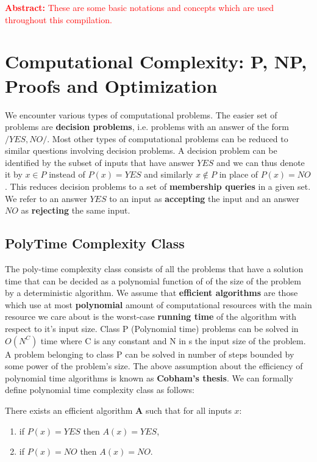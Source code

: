 \textcolor{red}{\textbf{Abstract:} These are some basic notations and concepts which are used throughout this compilation.}

\section{Computational Complexity: P, NP, Proofs and Optimization}
We encounter various types of computational problems. The easier set of problems are \textbf{decision problems}, i.e. problems with an answer of the form $/{YES, NO/}$. Most other types of computational problems can be reduced to similar questions involving decision problems. A decision problem can be identified by the subset of inputs that have answer $YES$ and we can thus denote it by $x \in P$ instead of $P(x) = YES$ and similarly $x \notin P$ in place of $P(x) = NO$. This reduces decision problems to a set of \textbf{membership queries} in a given set. We refer to an answer $YES$ to an input as \textbf{accepting} the input and an answer $NO$ as \textbf{rejecting} the same input.

 \subsection{PolyTime Complexity Class}
 The poly-time complexity class consists of all the problems that have  a solution time that can be decided as  a polynomial function of of the size of the problem by a deterministic algorithm. We assume that \textbf{efficient algorithms} are those which use at most \textbf{polynomial} amount of computational resources with the main resource we care about is the worst-case \textbf{running time} of the algorithm with respect to it's input size. Class P (Polynomial time) problems can be solved in $O(N^C)$ time where C is any constant and N in s the input size of the problem. A problem belonging to class P can be solved in number of steps bounded by some power of the problem's size. The above assumption about the efficiency of polynomial time algorithms is known as \textbf{Cobham's thesis}. We can formally define polynomial time complexity class as follows:
 
 There exists an efficient algorithm $\textbf{A}$ such that for all inputs $x$:
 \begin{enumerate}
     \item if $P(x) = YES$ then $A(x) = YES$,
     \item if $P(x) = NO$ then $A(x) = NO$.
 \end{enumerate}
 
